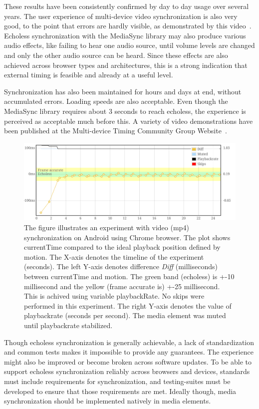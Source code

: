 These results have been consistently confirmed by day to day usage over
several years. The user experience of multi-device video synchronization is
also very good, to the point that errors are hardly visible, as demonstrated by
this video~\cite{carneval}. Echoless synchronization with the MediaSync
library may also produce various audio effects, like failing to hear one audio
source, until volume levels are changed and only the other audio source can be
heard. Since these effects are also achieved across browser types and
architectures, this is a strong indication that external timing is feasible
and already at a useful level.

Synchronization has also been maintained for hours and days at end, without
accumulated errors. Loading speeds are also acceptable. Even though the
MediaSync library requires about 3 seconds to reach echoless, the experience
is perceived as acceptable much before this. A variety of video demonstrations
have been published at the Multi-device Timing Community Group
Website~\cite{mtcg}.

\begin{figure}[h]
\centering
\includegraphics[scale=.23]{fig/android-video.png}
\caption{The figure illustrates an experiment with video (mp4) synchronization on
Android using Chrome browser. The plot shows currentTime compared to the ideal
playback position defined by motion. The X-axis denotes the timeline of the experiment (seconds).
The left Y-axis denotes difference \emph{Diff} (milliseconds) between currentTime and motion.
The green band (echoless) is +-10 millisecond and the yellow (frame accurate is) +-25 millisecond. 
This is achived using variable playbackRate. No skips were performed in this experiment. 
The right Y-axis denotes the value of playbackrate (seconds per second). The media element was muted until playbackrate stabilized.}
\label{fig:videosync}
\end{figure}

Though echoless synchronization is generally achievable, a lack of
standardization and common tests makes it impossible to provide any
guarantees. The experience might also be improved or become broken across
software updates. To be able to support echoless synchronization reliably
across browsers and devices, standards must include requirements for
synchronization, and testing-suites must be developed to ensure that those
requirements are met. Ideally though, media synchronization should be
implemented natively in media elements.


